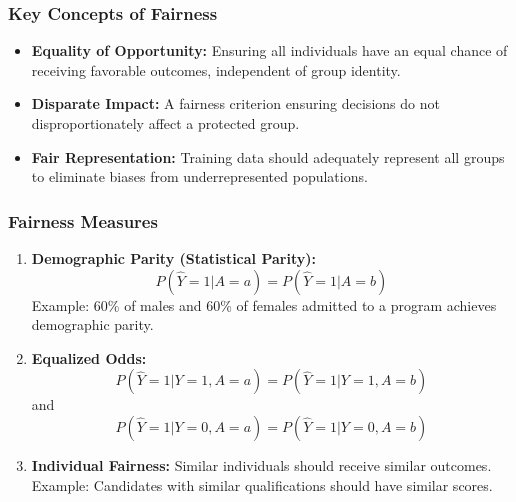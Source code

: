 \documentclass[aspectratio=169]{beamer}
\begin{document}
\begin{frame}[fragile]
    \frametitle{Key Concepts of Fairness}
    \begin{itemize}
        \item \textbf{Equality of Opportunity:} Ensuring all individuals have an equal chance of receiving favorable outcomes, independent of group identity.
        
        \item \textbf{Disparate Impact:} A fairness criterion ensuring decisions do not disproportionately affect a protected group.
        
        \item \textbf{Fair Representation:} Training data should adequately represent all groups to eliminate biases from underrepresented populations.
    \end{itemize}
\end{frame}

\begin{frame}[fragile]
    \frametitle{Fairness Measures}
    \begin{enumerate}
        \item \textbf{Demographic Parity (Statistical Parity):}
            \begin{equation}
            P(\hat{Y}=1 | A=a) = P(\hat{Y}=1 | A=b)
            \end{equation}
            Example: 60\% of males and 60\% of females admitted to a program achieves demographic parity.
        
        \item \textbf{Equalized Odds:}
            \begin{equation}
            P(\hat{Y}=1 | Y=1, A=a) = P(\hat{Y}=1 | Y=1, A=b) 
            \end{equation}
            and 
            \begin{equation}
            P(\hat{Y}=1 | Y=0, A=a) = P(\hat{Y}=1 | Y=0, A=b)
            \end{equation}
        
        \item \textbf{Individual Fairness:} Similar individuals should receive similar outcomes. Example: Candidates with similar qualifications should have similar scores.
    \end{enumerate}
\end{frame}
\end{document}
